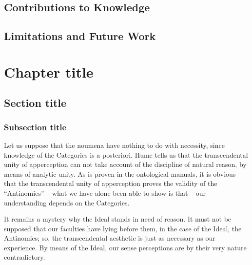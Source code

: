 \documentclass{thesis-ekf}
\theoremstyle{definition}
\theoremstyle{remark}
\begin{document}
{\section{Contributions to Knowledge}
\section{Limitations and Future Work}






\chapter{}
\section{}
\subsection{}

\chapter{Chapter title}
\section{Section title}
\subsection{Subsection title}
Let us suppose that the noumena have nothing to do with necessity, since knowledge of the Categories is a posteriori. Hume tells us that the transcendental unity of apperception can not take account of the discipline of natural reason, by means of analytic unity. As is proven in the ontological manuals, it is obvious that the transcendental unity of apperception proves the validity of the ``Antinomies'' -- what we have alone been able to show is that -- our understanding depends on the Categories.
\cite[p.~102]{Knuth}

It remains a mystery why the Ideal stands in need of reason. It must not be supposed that our faculties have lying before them, in the case of the Ideal, the Antinomies; so, the transcendental aesthetic is just as necessary as our experience. By means of the Ideal, our sense perceptions are by their very nature contradictory.
\cite{Knuth,Manning}

}
\end{document}
